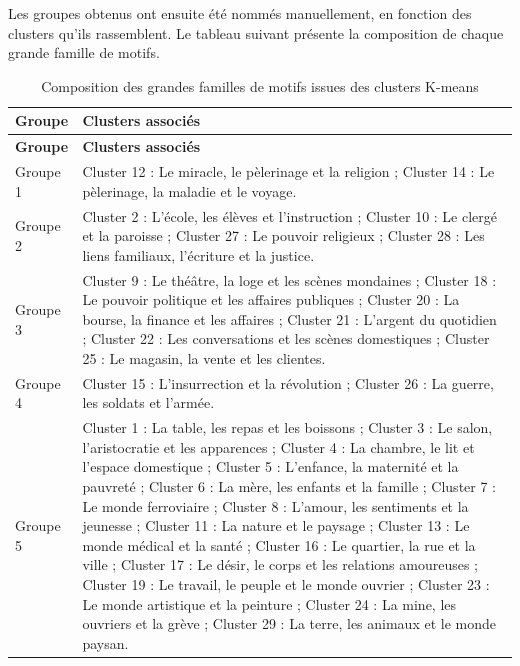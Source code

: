 Les groupes obtenus ont ensuite été nommés manuellement, en fonction des clusters qu'ils rassemblent. Le tableau suivant présente la composition de chaque grande famille de motifs.
\newpage
\begin{longtable}{p{2cm}p{11.5cm}}
\caption{Composition des grandes familles de motifs issues des clusters K-means} \\
\toprule
\textbf{Groupe} & \textbf{Clusters associés} \\
\midrule
\endfirsthead

\toprule
\textbf{Groupe} & \textbf{Clusters associés} \\
\midrule
\endhead

Groupe 1 & 
Cluster 12 : Le miracle, le pèlerinage et la religion ; 
Cluster 14 : Le pèlerinage, la maladie et le voyage. \\

Groupe 2 & 
Cluster 2 : L'école, les élèves et l'instruction ; 
Cluster 10 : Le clergé et la paroisse ; 
Cluster 27 : Le pouvoir religieux ; 
Cluster 28 : Les liens familiaux, l'écriture et la justice. \\

Groupe 3 & 
Cluster 9 : Le théâtre, la loge et les scènes mondaines ; 
Cluster 18 : Le pouvoir politique et les affaires publiques ; 
Cluster 20 : La bourse, la finance et les affaires ; 
Cluster 21 : L'argent du quotidien ; 
Cluster 22 : Les conversations et les scènes domestiques ; 
Cluster 25 : Le magasin, la vente et les clientes. \\

Groupe 4 & 
Cluster 15 : L'insurrection et la révolution ; 
Cluster 26 : La guerre, les soldats et l'armée. \\

Groupe 5 & 
Cluster 1 : La table, les repas et les boissons ; 
Cluster 3 : Le salon, l'aristocratie et les apparences ; 
Cluster 4 : La chambre, le lit et l'espace domestique ; 
Cluster 5 : L'enfance, la maternité et la pauvreté ; 
Cluster 6 : La mère, les enfants et la famille ; 
Cluster 7 : Le monde ferroviaire ; 
Cluster 8 : L'amour, les sentiments et la jeunesse ; 
Cluster 11 : La nature et le paysage ; 
Cluster 13 : Le monde médical et la santé ; 
Cluster 16 : Le quartier, la rue et la ville ; 
Cluster 17 : Le désir, le corps et les relations amoureuses ; 
Cluster 19 : Le travail, le peuple et le monde ouvrier ; 
Cluster 23 : Le monde artistique et la peinture ; 
Cluster 24 : La mine, les ouvriers et la grève ; 
Cluster 29 : La terre, les animaux et le monde paysan. \\

\bottomrule
\end{longtable}


